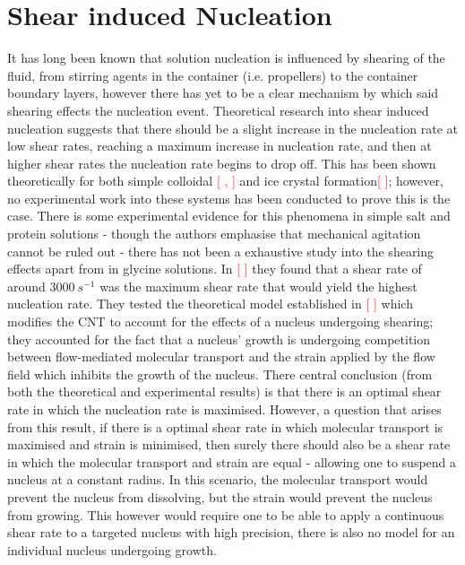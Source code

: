 \section{Shear induced Nucleation}
It has long been known that solution nucleation is influenced by shearing of the fluid, from stirring agents in the container (i.e. propellers) to the container boundary layers, however there has yet to be a clear mechanism by which said shearing effects the nucleation event. Theoretical research into shear induced nucleation suggests that there should be a slight increase in the nucleation rate at low shear rates, reaching a maximum increase in nucleation rate, and then at higher shear rates the nucleation rate begins to drop off. This has been shown theoretically for both simple colloidal \textcolor{red}{[ , ]}  and ice crystal formation\textcolor{red}{[ ]}; however, no experimental work into these systems has been conducted to prove this is the case.  There is some experimental evidence for this phenomena in simple salt and protein solutions - though the authors emphasise that mechanical agitation cannot be ruled out - there has not been a exhaustive study into the shearing effects apart from in glycine solutions. In \textcolor{red}{[ ]} they found that a shear rate of around $3000\ s^{-1}$ was the maximum shear rate that would yield the highest nucleation rate. They tested the theoretical model established in \textcolor{red}{[ ]} which modifies the CNT to account for the effects of a nucleus undergoing shearing; they accounted for the fact that a nucleus' growth is undergoing competition between flow-mediated molecular transport and the strain applied by the flow field which inhibits the growth of the nucleus. There central conclusion (from both the theoretical and experimental results) is that there is an optimal shear rate in which the nucleation rate is maximised. However, a question that arises from this result, if there is a optimal shear rate in which molecular transport is maximised and strain is minimised, then surely there should also be a shear rate in which the molecular transport and strain are equal - allowing one to suspend a nucleus at a constant radius. In this scenario, the molecular transport would prevent the nucleus from dissolving, but the strain would prevent the nucleus from growing. This however would require one to be able to apply a continuous shear rate to a targeted nucleus with high precision, there is also no model for an individual nucleus undergoing growth. 

